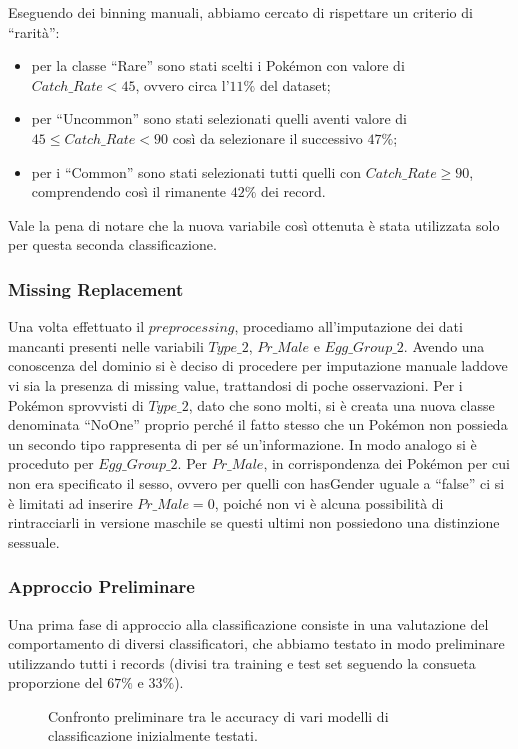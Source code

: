 \documentclass[fleqn,10pt]{SelfArx} %
\begin{document}
 Eseguendo dei binning manuali, abbiamo cercato di rispettare un criterio di “rarità”:
\begin{itemize}
\item per la classe “Rare” sono stati scelti i Pokémon con valore di $Catch\_Rate < 45$, ovvero circa l'$11\%$ del dataset; 
\item per “Uncommon” sono stati selezionati quelli aventi valore di $45 \leq Catch\_Rate < 90$ così da selezionare il successivo $47\%$; 
\item per i “Common” sono stati selezionati tutti quelli con $Catch\_Rate \geq 90$, comprendendo così il rimanente $42\%$ dei record.
\end{itemize} 
 Vale la pena di notare che la nuova variabile così ottenuta è stata utilizzata solo per questa seconda classificazione.
\subsubsection{Missing Replacement}\label{missing:sec}
Una volta effettuato il $preprocessing$, procediamo all'imputazione dei dati mancanti presenti nelle variabili $Type\_2$, $Pr\_Male$ e $Egg\_Group\_2$. Avendo una conoscenza del dominio si è deciso di procedere per imputazione manuale laddove vi sia la presenza di missing value, trattandosi di poche osservazioni. Per i Pokémon sprovvisti di $Type\_2$, dato che sono molti, si è creata una nuova classe denominata “NoOne” proprio perché il fatto stesso che un Pokémon non possieda un secondo tipo rappresenta di per sé un'informazione. In modo analogo si è proceduto per $Egg\_Group\_2$. Per $Pr\_Male$, in corrispondenza dei Pokémon per cui non era specificato il sesso, ovvero per quelli con hasGender uguale a “false” ci si è limitati ad inserire $Pr\_Male=0$, poiché non vi è alcuna possibilità di rintracciarli in versione maschile se questi ultimi non possiedono una distinzione sessuale.


\subsubsection{Approccio Preliminare}
Una prima fase di approccio alla classificazione consiste in una valutazione del comportamento di diversi classificatori, che abbiamo testato in modo preliminare utilizzando tutti i records (divisi tra training e test set seguendo la consueta proporzione del $67\%$ e $33\%$).
\begin{figure}

\caption{\label{preliminar:fig} Confronto preliminare tra le accuracy di vari modelli di classificazione inizialmente testati.}
\end{figure}
\end{document}
